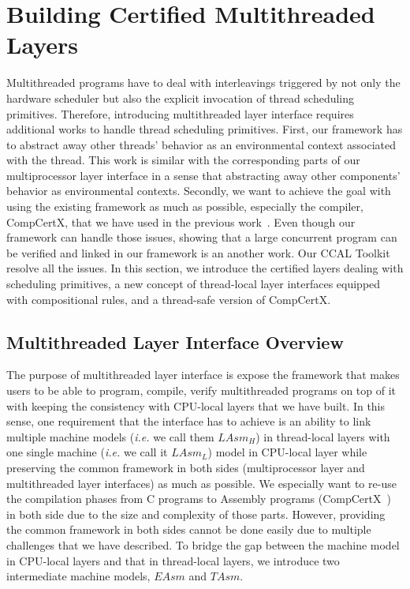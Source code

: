 
\section{Building Certified Multithreaded Layers}
\label{sec:multithreaded-layers}
Multithreaded programs have to deal with interleavings triggered by not only  the hardware scheduler
but also the  explicit invocation
of thread scheduling primitives. 
Therefore, introducing multithreaded layer interface requires additional works to handle thread scheduling primitives. 
First, our framework has to abstract away other threads' behavior 
as an environmental context associated with the thread.
This work is similar with the corresponding parts of our multiprocessor 
layer interface in a sense that abstracting away other components' behavior as environmental contexts.
Secondly, we want to achieve the goal with using the existing framework as much as possible, especially 
the compiler, CompCertX, that we have used in the previous work~\cite{dscal15}.
Even though our framework can handle those issues, showing that a 
large concurrent program can be verified and linked in our framework is an another work. 
Our CCAL Toolkit resolve all the issues.
In this section, we introduce  the certified layers
dealing with scheduling primitives, a new concept of thread-local layer interfaces equipped with
compositional rules, and a thread-safe version of CompCertX.

\subsection{Multithreaded Layer Interface Overview}\label{subsec:machinemodeloverview}

The purpose of multithreaded layer interface is expose the framework that makes users to be able to
program, compile, verify multithreaded programs on top of it with keeping the 
consistency with CPU-local layers that we have built.
In this sense, 
one requirement that the interface has to achieve is an ability to 
link multiple machine models (\textit{i.e.} 
we call them $LAsm_{H}$) in thread-local layers 
with one single machine (\textit{i.e.} we call it $LAsm_{L}$)
model in CPU-local layer while 
preserving the common framework in both sides (multiprocessor layer and multithreaded layer interfaces) 
as much as possible. 
We especially want to re-use the compilation phases from C programs to Assembly programs (CompCertX~\cite{dscal15}) 
in both side due to the size and complexity of those parts. 
However, providing the common framework in both sides 
cannot be done easily due to multiple challenges that we have described. 
To bridge the gap between the  machine model in CPU-local layers and
that in thread-local layers,
we introduce two intermediate machine models, $EAsm$ and $TAsm$. 

